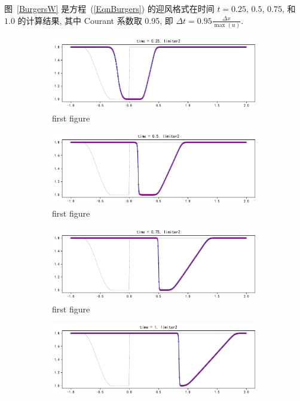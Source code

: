 \documentclass[10.5pt
]{article}
\begin{document}
图~\ref{BurgersW} 是方程~(\ref{EqnBurgers}) 的迎风格式在时间 $t = 0.25$, $0.5$, $0.75$, 和 $1.0$ 的计算结果, 其中 Courant 系数取 0.95,
即 $\Delta t = 0.95 \frac{\Delta x}{\max(u)}$.
\begin{figure} 
\centering
\begin{subfigure}{.9\linewidth}
  \includegraphics[width=\textwidth]{figures/problem2_limiter20.25.pdf} %
  \caption{first figure}
  \label{fig:problem2-1}
\end{subfigure}
\begin{subfigure}{.9\linewidth}
  \includegraphics[width=\textwidth]{figures/problem2_limiter20.5.pdf} %
  \caption{first figure}
  \label{fig:problem2-2}
\end{subfigure}
\begin{subfigure}{.9\linewidth}
  \includegraphics[width=\textwidth]{figures/problem2_limiter20.75.pdf} %
  \caption{first figure}
  \label{fig:problem2-3}
\end{subfigure}
\begin{subfigure}{.9\linewidth}
  \includegraphics[width=\textwidth]{figures/problem2_limiter21.pdf} %

\end{subfigure}
\end{figure}
\end{document}

